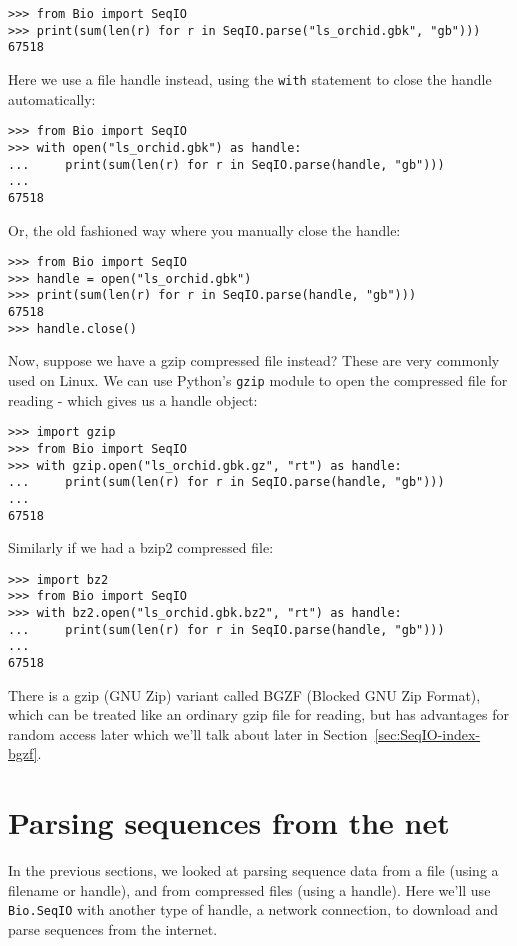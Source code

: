 \begin{verbatim}
>>> from Bio import SeqIO
>>> print(sum(len(r) for r in SeqIO.parse("ls_orchid.gbk", "gb")))
67518
\end{verbatim}

\noindent
Here we use a file handle instead, using the \verb|with| statement
to close the handle automatically:

\begin{verbatim}
>>> from Bio import SeqIO
>>> with open("ls_orchid.gbk") as handle:
...     print(sum(len(r) for r in SeqIO.parse(handle, "gb")))
...
67518
\end{verbatim}

\noindent
Or, the old fashioned way where you manually close the handle:

\begin{verbatim}
>>> from Bio import SeqIO
>>> handle = open("ls_orchid.gbk")
>>> print(sum(len(r) for r in SeqIO.parse(handle, "gb")))
67518
>>> handle.close()
\end{verbatim}

Now, suppose we have a gzip compressed file instead? These are very
commonly used on Linux. We can use Python's \verb|gzip| module to open
the compressed file for reading - which gives us a handle object:

\begin{verbatim}
>>> import gzip
>>> from Bio import SeqIO
>>> with gzip.open("ls_orchid.gbk.gz", "rt") as handle:
...     print(sum(len(r) for r in SeqIO.parse(handle, "gb")))
...
67518
\end{verbatim}

Similarly if we had a bzip2 compressed file:

\begin{verbatim}
>>> import bz2
>>> from Bio import SeqIO
>>> with bz2.open("ls_orchid.gbk.bz2", "rt") as handle:
...     print(sum(len(r) for r in SeqIO.parse(handle, "gb")))
...
67518
\end{verbatim}

There is a gzip (GNU Zip) variant called BGZF (Blocked GNU Zip Format),
which can be treated like an ordinary gzip file for reading, but has
advantages for random access later which we'll talk about later in
Section~\ref{sec:SeqIO-index-bgzf}.

\section{Parsing sequences from the net}
\label{sec:SeqIO_Online}
In the previous sections, we looked at parsing sequence data from a file
(using a filename or handle), and from compressed files (using a handle).
Here we'll use \verb|Bio.SeqIO| with another type of handle, a network
connection, to download and parse sequences from the internet.

